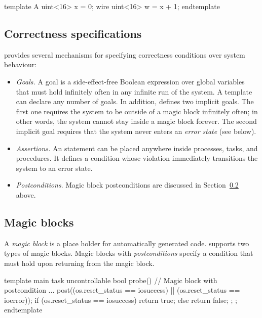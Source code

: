 \begin{tsllisting2}
template A
  uint<16> x = 0;
  wire uint<16> w = x + 1;
endtemplate
\end{tsllisting2}


\subsection{Correctness specifications}\label{s:o:correctness}

\tsl provides several mechanisms for specifying correctness 
conditions over system behaviour:
\begin{itemize}
    \item \emph{Goals.} A goal is a side-effect-free Boolean 
        expression over global variables that must hold infinitely 
        often in any infinite run of the system.  A template can 
        declare any number of goals.  In addition, \tsl defines 
        two implicit goals.  The first one requires the system to 
        be outside of a magic block infinitely often; in other 
        words, the system cannot stay inside a magic block 
        forever.  The second implicit goal requires that the 
        system never enters an \emph{error state} (see below).
    \item \emph{Assertions.}  An  statement can be 
        placed anywhere inside processes, tasks, and procedures.  
        It defines a condition whose violation immediately 
        transitions the system to an error state.
    \item \emph{Postconditions}.  Magic block postconditions are 
        discussed in Section~\ref{s:o:magic} above.
\end{itemize}



\subsection{Magic blocks}\label{s:o:magic}

A \emph{magic block} is a place holder for automatically generated 
code.  \tsl supports two types of magic blocks.  Magic blocks with 
\emph{postconditions} specify a condition that must hold upon 
returning from the magic block.  


\begin{tsllisting2}
template main
  task uncontrollable bool probe() {
    // Magic block with postcondition
    {...} post((os.reset_status == iosuccess) ||
               (os.reset_status == ioerror));
    if (os.reset_status == iosuccess) {
      return true;
    } else {
      return false;
    };
};
endtemplate
\end{tsllisting2}

